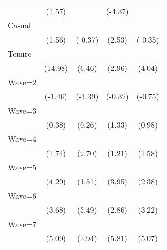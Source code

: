 {\begin{tabular}{l*{4}{c}}
                    &      (1.57)         &                     &     (-4.37)         &                     \\
[1em]
Casual              &                     &                     &            \sym{*}  &                     \\
                    &      (1.56)         &     (-0.37)         &      (2.53)         &     (-0.35)         \\
[1em]
Tenure              &            \sym{***}&            \sym{***}&            \sym{**} &            \sym{***}\\
                    &     (14.98)         &      (6.46)         &      (2.96)         &      (4.04)         \\
[1em]
Wave=2              &                     &                     &                     &                     \\
                    &     (-1.46)         &     (-1.39)         &     (-0.32)         &     (-0.75)         \\
[1em]
Wave=3              &                     &                     &                     &                     \\
                    &      (0.38)         &      (0.26)         &      (1.33)         &      (0.98)         \\
[1em]
Wave=4              &                     &            \sym{**} &                     &                     \\
                    &      (1.74)         &      (2.70)         &      (1.21)         &      (1.58)         \\
[1em]
Wave=5              &            \sym{***}&                     &            \sym{***}&            \sym{*}  \\
                    &      (4.29)         &      (1.51)         &      (3.95)         &      (2.38)         \\
[1em]
Wave=6              &            \sym{***}&            \sym{***}&            \sym{**} &            \sym{**} \\
                    &      (3.68)         &      (3.49)         &      (2.86)         &      (3.22)         \\
[1em]
Wave=7              &            \sym{***}&            \sym{***}&            \sym{***}&            \sym{***}\\
                    &      (5.09)         &      (3.94)         &      (5.81)         &      (5.07)         \\

\end{tabular}}
